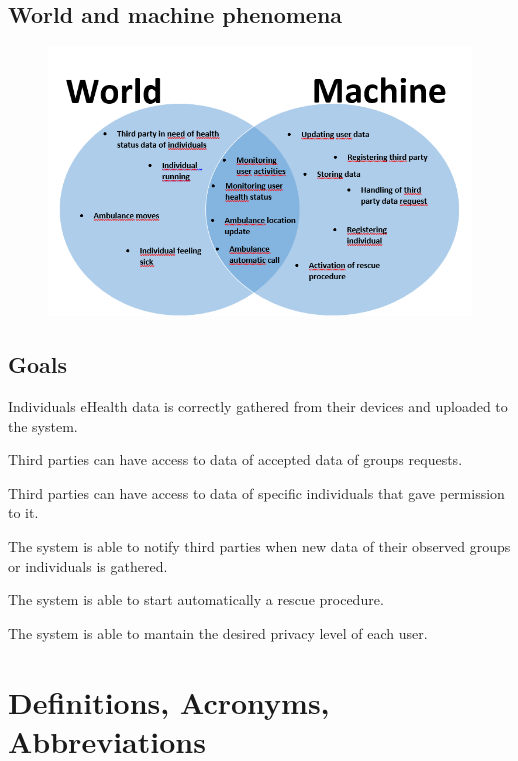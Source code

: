 \subsection{World and machine phenomena}
\begin{figure}
\centering
\includegraphics[scale=0.7]{img/phenomena.png}
\end{figure}


\subsection{Goals}

\begin{goal}
Individuals eHealth data is correctly gathered from their devices and uploaded to the system.
\end{goal}
\begin{goal}
Third parties can have access to data of accepted data of groups requests.
\end{goal}
\begin{goal}
Third parties can have access to data of specific individuals that gave permission to it.
\end{goal}
\begin{goal}
The system is able to notify third parties when new data of their observed groups or individuals is gathered.
\end{goal}
\begin{goal}
The system is able to start automatically a rescue procedure.
\end{goal}
\begin{goal}
The system is able to mantain the desired privacy level of each user.
\end{goal}
\section{Definitions, Acronyms, Abbreviations}

